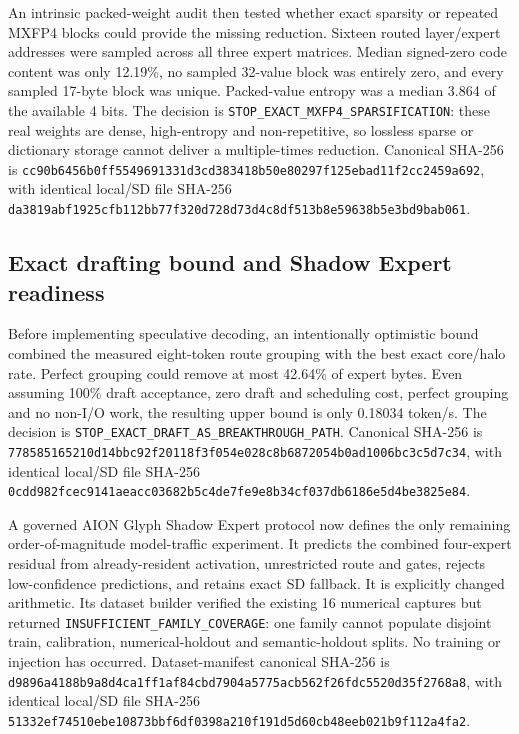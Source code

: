 An intrinsic packed-weight audit then tested whether exact sparsity or repeated
MXFP4 blocks could provide the missing reduction.  Sixteen routed layer/expert
addresses were sampled across all three expert matrices.  Median signed-zero
code content was only 12.19\%, no sampled 32-value block was entirely zero,
and every sampled 17-byte block was unique.  Packed-value entropy was a median
3.864 of the available 4 bits.  The decision is
\texttt{STOP\_EXACT\_MXFP4\_SPARSIFICATION}: these real weights are dense,
high-entropy and non-repetitive, so lossless sparse or dictionary storage cannot
deliver a multiple-times reduction.  Canonical SHA-256 is
\texttt{cc90b6456b0ff5549691331d3cd383418b50e80297f125ebad11f2cc2459a692},
with identical local/SD file SHA-256
\texttt{da3819abf1925cfb112bb77f320d728d73d4c8df513b8e59638b5e3bd9bab061}.

\subsection{Exact drafting bound and Shadow Expert readiness}

Before implementing speculative decoding, an intentionally optimistic bound
combined the measured eight-token route grouping with the best exact core/halo
rate.  Perfect grouping could remove at most 42.64\% of expert bytes.  Even
assuming 100\% draft acceptance, zero draft and scheduling cost, perfect
grouping and no non-I/O work, the resulting upper bound is only 0.18034
token/s.  The decision is
\texttt{STOP\_EXACT\_DRAFT\_AS\_BREAKTHROUGH\_PATH}.  Canonical SHA-256 is
\texttt{778585165210d14bbc92f20118f3f054e028c8b6872054b0ad1006bc3c5d7c34},
with identical local/SD file SHA-256
\texttt{0cdd982fcec9141aeacc03682b5c4de7fe9e8b34cf037db6186e5d4be3825e84}.

A governed AION Glyph Shadow Expert protocol now defines the only remaining
order-of-magnitude model-traffic experiment.  It predicts the combined
four-expert residual from already-resident activation, unrestricted route and
gates, rejects low-confidence predictions, and retains exact SD fallback.  It
is explicitly changed arithmetic.  Its dataset builder verified the existing
16 numerical captures but returned
\texttt{INSUFFICIENT\_FAMILY\_COVERAGE}: one family cannot populate disjoint
train, calibration, numerical-holdout and semantic-holdout splits.  No training
or injection has occurred.  Dataset-manifest canonical SHA-256 is
\texttt{d9896a4188b9a8d4ca1ff1af84cbd7904a5775acb562f26fdc5520d35f2768a8},
with identical local/SD file SHA-256
\texttt{51332ef74510ebe10873bbf6df0398a210f191d5d60cb48eeb021b9f112a4fa2}.

